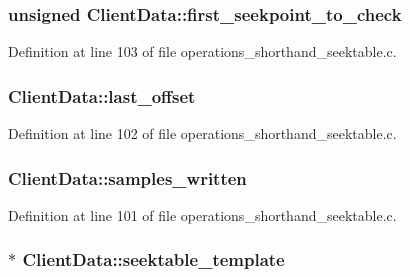 \subsubsection[{\texorpdfstring{first\+\_\+seekpoint\+\_\+to\+\_\+check}{first_seekpoint_to_check}}]{\setlength{\rightskip}{0pt plus 5cm}unsigned Client\+Data\+::first\+\_\+seekpoint\+\_\+to\+\_\+check}\hypertarget{struct_client_data_a411472e0a029ebd8fdac443cdbfc266f}{}\label{struct_client_data_a411472e0a029ebd8fdac443cdbfc266f}


Definition at line 103 of file operations\+\_\+shorthand\+\_\+seektable.\+c.

\subsubsection[{\texorpdfstring{last\+\_\+offset}{last_offset}}]{ Client\+Data\+::last\+\_\+offset}\hypertarget{struct_client_data_ad925313e711da4224871670a62be0446}{}\label{struct_client_data_ad925313e711da4224871670a62be0446}


Definition at line 102 of file operations\+\_\+shorthand\+\_\+seektable.\+c.

\subsubsection[{\texorpdfstring{samples\+\_\+written}{samples_written}}]{ Client\+Data\+::samples\+\_\+written}\hypertarget{struct_client_data_ae810896908bfc68291ceb7de7cbe6bd8}{}\label{struct_client_data_ae810896908bfc68291ceb7de7cbe6bd8}


Definition at line 101 of file operations\+\_\+shorthand\+\_\+seektable.\+c.

\subsubsection[{\texorpdfstring{seektable\+\_\+template}{seektable_template}}]{$\ast$ Client\+Data\+::seektable\+\_\+template}\hypertarget{struct_client_data_a93a69c5edfdd7662e6f43e4e2b4b0e1e}{}\label{struct_client_data_a93a69c5edfdd7662e6f43e4e2b4b0e1e}


